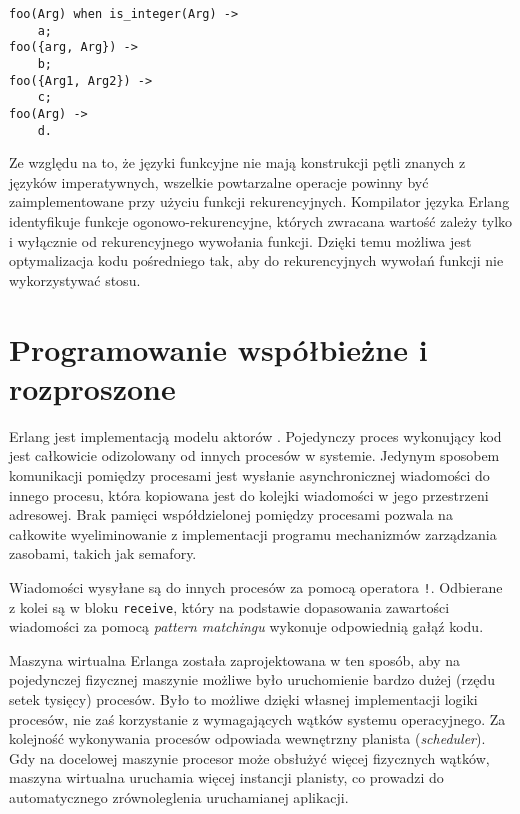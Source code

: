 \begin{lstlisting}[style=erlang, caption=Przykład \emph{pattern matchingu}, label=lis:patternmatching]
foo(Arg) when is_integer(Arg) ->
    a;
foo({arg, Arg}) ->
    b;
foo({Arg1, Arg2}) ->
    c;
foo(Arg) ->
    d.
\end{lstlisting}

Ze względu na to, że języki funkcyjne nie mają konstrukcji pętli znanych z języków imperatywnych, wszelkie powtarzalne operacje powinny być zaimplementowane przy użyciu funkcji rekurencyjnych.
Kompilator języka Erlang identyfikuje funkcje ogonowo-rekurencyjne, których zwracana wartość zależy tylko i wyłącznie od rekurencyjnego wywołania funkcji. Dzięki temu możliwa jest optymalizacja kodu pośredniego tak, aby do rekurencyjnych wywołań funkcji nie wykorzystywać stosu.

\section{Programowanie współbieżne i rozproszone}
\label{sec:erlangConcurrent}

Erlang jest implementacją modelu aktorów \cite{Hewitt73}.
Pojedynczy proces wykonujący kod jest całkowicie odizolowany od innych procesów w systemie.
Jedynym sposobem komunikacji pomiędzy procesami jest wysłanie asynchronicznej wiadomości do innego procesu, która kopiowana jest do kolejki wiadomości w jego przestrzeni adresowej.
Brak pamięci współdzielonej pomiędzy procesami pozwala na całkowite wyeliminowanie z implementacji programu mechanizmów zarządzania zasobami, takich jak semafory. 

Wiadomości wysyłane są do innych procesów za pomocą operatora \texttt{!}.
Odbierane z kolei są w bloku \texttt{receive}, który na podstawie dopasowania zawartości wiadomości za pomocą \emph{pattern matchingu} wykonuje odpowiednią gałąź kodu.

Maszyna wirtualna Erlanga została zaprojektowana w ten sposób, aby na pojedynczej fizycznej maszynie możliwe było uruchomienie bardzo dużej (rzędu setek tysięcy) procesów. Było to możliwe dzięki własnej implementacji logiki procesów, nie zaś korzystanie z wymagających wątków systemu operacyjnego. Za kolejność wykonywania procesów odpowiada wewnętrzny planista (\emph{scheduler}).
Gdy na docelowej maszynie procesor może obsłużyć więcej fizycznych wątków, maszyna wirtualna uruchamia więcej instancji planisty, co prowadzi do automatycznego zrównoleglenia uruchamianej aplikacji.

